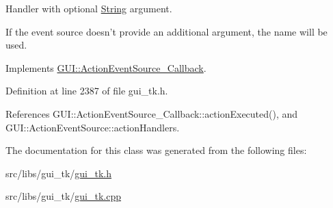 Handler with optional \hyperlink{classGUI_1_1String}{String} argument. 

If the event source doesn't provide an additional argument, the name will be used. 

Implements \hyperlink{structGUI_1_1ActionEventSource__Callback_a36df23a424558a83b45e3e3d5c175cf2}{G\-U\-I\-::\-Action\-Event\-Source\-\_\-\-Callback}.



Definition at line 2387 of file gui\-\_\-tk.\-h.



References G\-U\-I\-::\-Action\-Event\-Source\-\_\-\-Callback\-::action\-Executed(), and G\-U\-I\-::\-Action\-Event\-Source\-::action\-Handlers.



The documentation for this class was generated from the following files\-:\begin{DoxyCompactItemize}
\item 
src/libs/gui\-\_\-tk/\hyperlink{gui__tk_8h}{gui\-\_\-tk.\-h}\item 
src/libs/gui\-\_\-tk/\hyperlink{gui__tk_8cpp}{gui\-\_\-tk.\-cpp}\end{DoxyCompactItemize}
